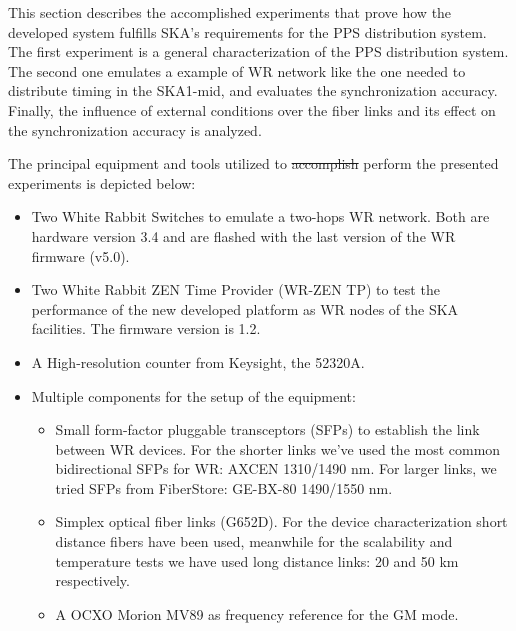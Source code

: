 
This section describes the accomplished experiments that prove how the 
developed system fulfills SKA's requirements for the PPS distribution system. 
  The first experiment is a general 
characterization of the PPS distribution system. The second one emulates a 
example of WR network like the one needed to distribute timing in the SKA1-mid, 
and evaluates the synchronization accuracy. Finally, the influence of external 
conditions over the fiber links and its effect on the synchronization accuracy 
is analyzed.

The principal equipment and tools utilized to \st{accomplish} perform the presented 
experiments is depicted below:

\begin{itemize}
    \item Two White Rabbit Switches to emulate a two-hops WR network. Both are 
    hardware version 3.4 and are flashed with the last version of the WR 
    firmware (v5.0).
    
    \item Two White Rabbit ZEN Time Provider (WR-ZEN TP) to test the 
    performance 
    of the new developed platform as WR nodes of the SKA facilities. The 
    firmware version is 1.2. 
    
    \item A High-resolution counter from Keysight, the 52320A.
    
    \item Multiple components for the setup of the equipment:
    \begin{itemize}
        \item Small form-factor pluggable transceptors (SFPs) to establish the 
        link between WR devices. For the shorter links we've used the most 
        common bidirectional SFPs for WR: AXCEN 1310/1490 nm. For larger links, 
        we tried 
        SFPs from FiberStore: GE-BX-80 1490/1550 nm.
        \item Simplex optical fiber links (G652D). For the device 
        characterization short distance fibers have been used, meanwhile for 
        the scalability and temperature tests we have used long distance links: 
        20 and 50 km respectively.
        \item A OCXO Morion MV89 as frequency reference for the GM mode.
    \end{itemize}
    
\end{itemize}

